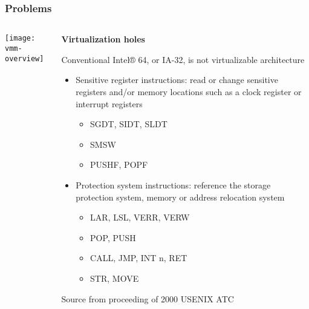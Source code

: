 \begin{frame}[plain]
	\frametitle{Problems }
	
	
	
	\begin{columns}
		
		\begin{column}{.3\textwidth}
			
			\texttt{[image: vmm-overview]}
			
		\end{column}
		
		\begin{column}{.7\textwidth}
			
			\textbf{Virtualization holes}

		 Conventional Intel® 64, or IA-32, is not virtualizable architecture
			\begin{itemize}
				\item Sensitive register instructions: read or change sensitive registers and/or memory locations such as a clock register or interrupt registers

					\begin{itemize}
					\item  SGDT, SIDT, SLDT
					\item  SMSW 
					\item PUSHF, POPF 
					
					\end{itemize} 
				\item Protection system instructions: reference the storage protection system, memory or address relocation system
			
					\begin{itemize}
					\item  LAR, LSL, VERR, VERW 
					\item  POP, PUSH
					\item  CALL, JMP, INT n, RET 
					\item STR, MOVE
					\end{itemize} 
		
			\end{itemize} 
				\tiny Source from proceeding of 2000 USENIX ATC
		\end{column}
		
		
	\end{columns}
	
	
\end{frame}



